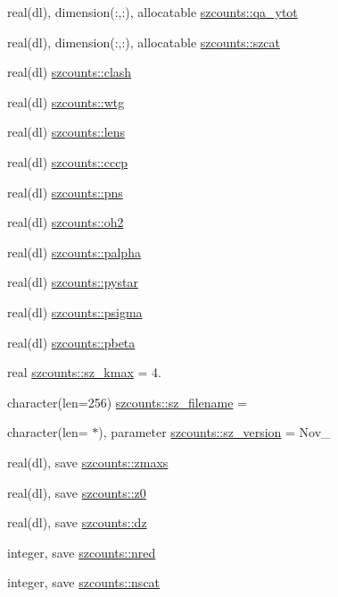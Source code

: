 \begin{DoxyCompactItemize}
real(dl), dimension(\+:,\+:), allocatable \mbox{\hyperlink{namespaceszcounts_a4aebae61d9611765edf7687fe66c383d}{szcounts\+::qa\+\_\+ytot}}
\item 
real(dl), dimension(\+:,\+:), allocatable \mbox{\hyperlink{namespaceszcounts_addcf659f211cb953c4ed1510888bc24a}{szcounts\+::szcat}}
\item 
real(dl) \mbox{\hyperlink{namespaceszcounts_adffd232373e78bf39d363f027f0564ff}{szcounts\+::clash}}
\item 
real(dl) \mbox{\hyperlink{namespaceszcounts_a1e8fc0be8d32aa9edec391fdc16f1978}{szcounts\+::wtg}}
\item 
real(dl) \mbox{\hyperlink{namespaceszcounts_a93fe6f6bac05415c56bdb59429db5345}{szcounts\+::lens}}
\item 
real(dl) \mbox{\hyperlink{namespaceszcounts_a64fdba6e458ea314da7f871a1ec879ae}{szcounts\+::cccp}}
\item 
real(dl) \mbox{\hyperlink{namespaceszcounts_afd77c97be9a90a59819249f5cc73760b}{szcounts\+::pns}}
\item 
real(dl) \mbox{\hyperlink{namespaceszcounts_acb8cfec6e2fe1c42d1e65aa06c0b81df}{szcounts\+::oh2}}
\item 
real(dl) \mbox{\hyperlink{namespaceszcounts_a162a76075580761ec2e15dd4e6d716fd}{szcounts\+::palpha}}
\item 
real(dl) \mbox{\hyperlink{namespaceszcounts_af79e33e4d88161185c0ab245f42a51f2}{szcounts\+::pystar}}
\item 
real(dl) \mbox{\hyperlink{namespaceszcounts_a6dfdc3232342e7579dcc7dae3506d7fd}{szcounts\+::psigma}}
\item 
real(dl) \mbox{\hyperlink{namespaceszcounts_a195fa99a01ff79fd80fe03fb78b8b573}{szcounts\+::pbeta}}
\item 
real \mbox{\hyperlink{namespaceszcounts_a8f0eaabdc83a62e45bf24daf1e820e76}{szcounts\+::sz\+\_\+kmax}} = 4.
\item 
character(len=256) \mbox{\hyperlink{namespaceszcounts_ad7b2b406324ec451bf7199f40411f42b}{szcounts\+::sz\+\_\+filename}} = \textquotesingle{}\textquotesingle{}
\item 
character(len= $\ast$), parameter \mbox{\hyperlink{namespaceszcounts_aa726969ed60d9d595227138f6fae1b5e}{szcounts\+::sz\+\_\+version}} = \textquotesingle{}Nov\+\_\textquotesingle{}
\item 
real(dl), save \mbox{\hyperlink{namespaceszcounts_ab3202a28ada73a28c4052802235a7f04}{szcounts\+::zmaxs}}
\item 
real(dl), save \mbox{\hyperlink{namespaceszcounts_a2718f37c5199b68be9ce1a3298a1a64f}{szcounts\+::z0}}
\item 
real(dl), save \mbox{\hyperlink{namespaceszcounts_a6a402ad033e07eecf06cdd670fabfd78}{szcounts\+::dz}}
\item 
integer, save \mbox{\hyperlink{namespaceszcounts_a16edd363d924414dcf42aff90a5b5cf1}{szcounts\+::nred}}
\item 
integer, save \mbox{\hyperlink{namespaceszcounts_ae530cb9d64e88dd1ab20e603295c1d7b}{szcounts\+::nscat}}
\end{DoxyCompactItemize}
